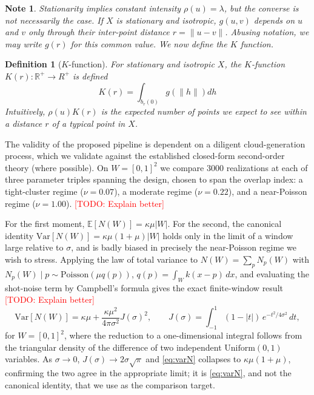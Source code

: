 \documentclass[11pt,letterpaper]{article}
\newcommand{\R}{\mathbb{R}}
\newcommand{\1}{\mathds{1}}
\newcommand{\todo}[1]{\textcolor{red}{[TODO: #1]}}
\newcommand{\fix}[1]{\textcolor{blue}{[FIX: #1]}}
\newcommand{\todo}[1]{}\newcommand{\fix}[1]{}
\theoremstyle{plain}
\theoremstyle{definitioncolon}
\newtheorem{definition}[theorem]{Definition}
\newtheorem*{note}{Note}
\begin{document}
    \begin{note}
        Stationarity implies constant intensity $\rho(u) = \lambda$, but the
        converse is not necessarily the case. If $X$ is stationary and isotropic,
        $g(u, v)$ depends on $u$ and $v$ only through their inter-point distance
        $r = \|u - v\|$. Abusing notation, we may write $g(r)$ for this common
        value. We now define the $K$ function.
    \end{note}

    \begin{definition}[$K$-function]
    \label{def:kfunc}
        For stationary and isotropic $X$, the $K$-function
        $K(r): \R^+ \rightarrow R^+$ is defined
            \[
            K(r) = \int_{b_r(0)} g(\|h\|) dh
            \]
        Intuitively, $\rho(u)K(r)$ is the expected number of points we expect to
        see within a distance $r$ of a typical point in $X$.
    \end{definition}

The validity of the proposed pipeline is dependent on a diligent cloud-generation
process, which we validate against the established closed-form second-order theory 
(where possible).
On $W = [0,1]^2$ we compare $3000$ realizations at each of three parameter
triples spanning the design, chosen to span the overlap index: a tight-cluster
regime ($\nu = 0.07$), a moderate regime ($\nu = 0.22$), and a near-Poisson
regime ($\nu = 1.00$). \todo{Explain better}

For the first moment, $\mathbb{E}[N(W)] = \kappa\mu|W|$. For the second, the
canonical identity $\mathrm{Var}[N(W)] = \kappa\mu(1+\mu)|W|$ holds only in the
limit of a window large relative to $\sigma$, and is badly biased in precisely
the near-Poisson regime we wish to stress. Applying the law of total variance to
$N(W) = \sum_p N_p(W)$ with
$N_p(W) \mid p \sim \mathrm{Poisson}(\mu q(p))$, $q(p) = \int_W k(x-p)\,dx$, and
evaluating the shot-noise term by Campbell's formula gives the exact
finite-window result \todo{Explain better}
    \begin{equation}
    \label{eq:varN}
    \mathrm{Var}[N(W)] = \kappa\mu + \frac{\kappa\mu^2}{4\pi\sigma^2}J(\sigma)^2,
    \qquad
    J(\sigma) = \int_{-1}^{1}(1-|t|)\,e^{-t^2/4\sigma^2}\,dt,
    \end{equation}
for $W = [0,1]^2$, where the reduction to a one-dimensional integral follows from
the triangular density of the difference of two independent
$\mathrm{Uniform}(0,1)$ variables. As $\sigma \to 0$,
$J(\sigma) \to 2\sigma\sqrt{\pi}$ and \eqref{eq:varN} collapses to
$\kappa\mu(1+\mu)$, confirming the two agree in the appropriate limit; it is
\eqref{eq:varN}, and not the canonical identity, that we use as the comparison
target.
\end{document}
